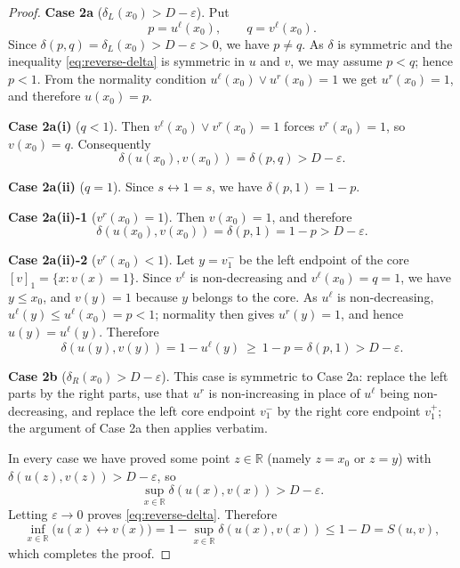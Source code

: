 \documentclass[preprint,3p,times]{elsarticle}
\theoremstyle{plain}
\theoremstyle{definition}
\numberwithin{equation}{section}
\begin{document}
\begin{proof}
\medskip
\noindent\textbf{Case 2a} ($\delta_L(x_0)>D-\varepsilon$). Put
\[
p=u^\ell(x_0),\qquad q=v^\ell(x_0).
\]
Since $\delta(p,q)=\delta_L(x_0)>D-\varepsilon>0$, we have $p\ne q$.
As $\delta$ is symmetric and the inequality \eqref{eq:reverse-delta} is
symmetric in $u$ and $v$, we may assume $p<q$; hence $p<1$. From the
normality condition $u^\ell(x_0)\vee u^r(x_0)=1$ we get $u^r(x_0)=1$,
and therefore $u(x_0)=p$.

\noindent\textbf{Case 2a(i)} ($q<1$). Then
$v^\ell(x_0)\vee v^r(x_0)=1$ forces $v^r(x_0)=1$, so $v(x_0)=q$.
Consequently
\[
\delta(u(x_0),v(x_0))=\delta(p,q)>D-\varepsilon.
\]

\noindent\textbf{Case 2a(ii)} ($q=1$). Since $s\leftrightarrow1=s$, we
have $\delta(p,1)=1-p$.

\noindent\textbf{Case 2a(ii)-1} ($v^r(x_0)=1$). Then $v(x_0)=1$, and
therefore
\[
\delta(u(x_0),v(x_0))=\delta(p,1)=1-p>D-\varepsilon.
\]

\noindent\textbf{Case 2a(ii)-2} ($v^r(x_0)<1$). Let $y=v^-_1$ be the
left endpoint of the core $[v]_1=\{x:v(x)=1\}$. Since $v^\ell$ is
non-decreasing and $v^\ell(x_0)=q=1$, we have $y\le x_0$, and
$v(y)=1$ because $y$ belongs to the core. As $u^\ell$ is
non-decreasing, $u^\ell(y)\le u^\ell(x_0)=p<1$; normality then gives
$u^r(y)=1$, and hence $u(y)=u^\ell(y)$. Therefore
\[
\delta(u(y),v(y))
=1-u^\ell(y)
\ \ge\ 1-p
=\delta(p,1)>D-\varepsilon.
\]

\medskip
\noindent\textbf{Case 2b} ($\delta_R(x_0)>D-\varepsilon$). This case is
symmetric to Case 2a: replace the left parts by the right parts, use
that $u^r$ is non-increasing in place of $u^\ell$ being non-decreasing,
and replace the left core endpoint $v^-_1$ by the right core endpoint
$v^+_1$; the argument of Case 2a then applies verbatim.

In every case we have proved some point $z\in\mathbb{R}$ (namely
$z=x_0$ or $z=y$) with $\delta(u(z),v(z))>D-\varepsilon$, so
\[
\sup_{x\in\mathbb{R}}\delta(u(x),v(x))>D-\varepsilon.
\]
Letting $\varepsilon\to0$ proves \eqref{eq:reverse-delta}. Therefore
\[
\inf_{x\in\mathbb{R}}\bigl(u(x)\leftrightarrow v(x)\bigr)
=1-\sup_{x\in\mathbb{R}}\delta(u(x),v(x))
\le 1-D=S(u,v),
\]
which completes the proof.
\end{proof}
\end{document}
